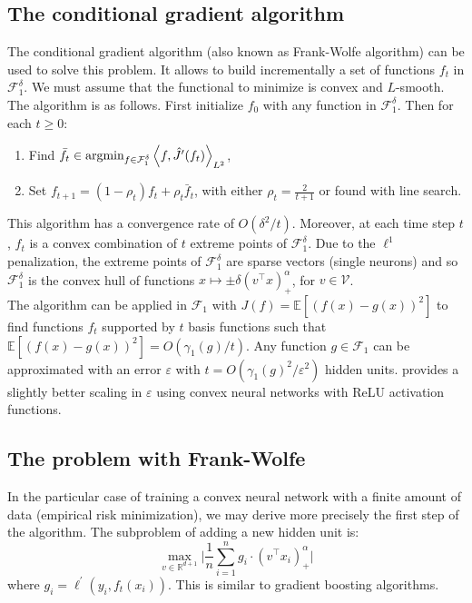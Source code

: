 \documentclass[a4paper, 11pt]{scrartcl}
\begin{document}
 
\subsection{The conditional gradient algorithm}
 
The conditional gradient algorithm (also known as Frank-Wolfe algorithm) can be used to solve this problem. It allows to build incrementally a set of functions $f_t$ in $\mathcal{F}_1^\delta$. We must assume that the functional to minimize is convex and $L$-smooth.\\

The algorithm is as follows. First initialize $f_0$ with any function in  $\mathcal{F}_1^\delta$. Then for each $t\geq 0$:
\begin{enumerate}
\item Find $\bar f_t \in \textnormal{argmin}_{f \in \mathcal{F}_1^\delta} \left\langle f, \hat J^\prime (f_t) \right\rangle_{L^2}$,
\item Set $f_{t+1} = (1 - \rho_t) f_t + \rho_t \bar f_t$, with either $\rho_t = \frac{2}{t+1}$ or found with line search.
\end{enumerate}

This algorithm has a convergence rate of $O(\delta^2 /t)$. Moreover, at each time step $t$, $f_t$ is a convex combination of $t$ extreme points of $\mathcal{F}_1^\delta$. Due to the $\ell^1$ penalization, the extreme points of $\mathcal{F}_1^\delta$ are sparse vectors (single neurons) and so $\mathcal{F}_1^\delta$ is the convex hull of functions $x \mapsto \pm \delta  (v^\top x)^\alpha_{+}$, for $v \in \mathcal{V}$.\\


The algorithm can be applied in $\mathcal{F}_1$ with $J(f) = \mathbb{E}\left[(f(x) - g(x))^2\right]$ to find functions $f_t$ supported by $t$ basis functions such that $\mathbb{E}\left[(f(x) - g(x))^2\right] = O(\gamma_1(g) /t)$. Any function $g \in \mathcal{F}_1$ can be approximated with an error $\varepsilon$ with $t = O(\gamma_1(g)^2 /\varepsilon^2)$ hidden units. \cite{bach2017breaking} provides a slightly better scaling in $\varepsilon$ using convex neural networks with ReLU activation functions.

\subsection{The problem with Frank-Wolfe}

In the particular case of training a convex neural network with a finite amount of data (empirical risk minimization), we may derive more precisely the first step of the algorithm. The subproblem of adding a new hidden unit is:
\begin{equation}
\max_{v \in \mathbb{R}^{d+1}} \Biggl\lvert\frac{1}{n} \sum_{i=1}^n g_i \cdot (v^\top x_i)^\alpha_+ \Biggr\rvert
\end{equation}
where $g_i = \ell^\prime(y_i, f_t(x_i))$. This is similar to gradient boosting algorithms.\\
\end{document}

